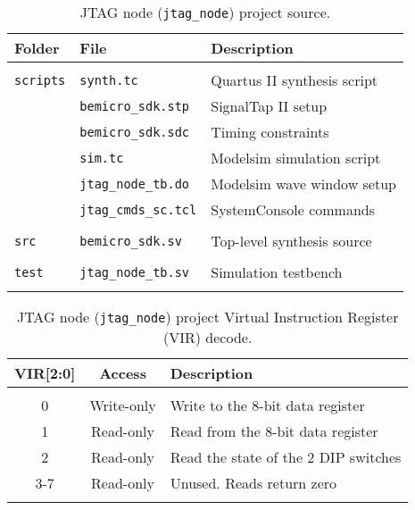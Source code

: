 \documentclass[10pt,twoside]{article}
\begin{document}
%
\begin{table}[t]
\caption{JTAG node ({\tt jtag\_node}) project source.}
\label{tab:jtag_node_source}
\begin{center}
\begin{tabular}{|l|l|p{7cm}|}
\hline
Folder & File & Description\\
\hline\hline
&&\\
\verb+scripts+ & \verb+synth.tc+         & Quartus II synthesis script\\
               & \verb+bemicro_sdk.stp+  & SignalTap II setup\\
               & \verb+bemicro_sdk.sdc+  & Timing constraints\\
               & \verb+sim.tc+           & Modelsim simulation script\\
               & \verb+jtag_node_tb.do+  & Modelsim wave window setup\\
               & \verb+jtag_cmds_sc.tcl+ & SystemConsole commands\\
&&\\
\verb+src+     & \verb+bemicro_sdk.sv+ & Top-level synthesis source\\
&&\\
\verb+test+    & \verb+jtag_node_tb.sv+ & Simulation testbench\\
&&\\
\hline
\end{tabular}
\end{center}
\end{table}

%
\begin{table}[t]
\caption{JTAG node ({\tt jtag\_node}) project Virtual Instruction Register (VIR) decode.}
\label{tab:jtag_node_registers}
\begin{center}
\begin{tabular}{|c|c|p{7cm}|}
\hline
VIR[2:0] & Access & Description\\
\hline\hline
&&\\
0   & Write-only & Write to the 8-bit data register\\
1   & Read-only  & Read from the 8-bit data register\\
2   & Read-only  & Read the state of the 2 DIP switches\\
3-7 & Read-only  & Unused. Reads return zero\\
&&\\
\hline
\end{tabular}
\end{center}
\end{table}
\end{document}
